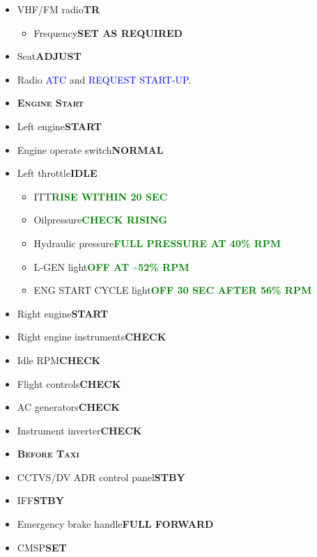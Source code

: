 \documentclass[a4paper,12pt,dvipsnames]{letter}
\newcommand{\radio}[1]{\textcolor{blue}{#1}}
\newcommand{\button}[1]{\textbf{#1}}
\newcommand{\ok}[1]{\textcolor{Green}{\textbf{#1}}}
\newcommand{\myHead}[1]{{\LARGE\textsc{\textbf{#1}}}}
\begin{document}
{\begin{itemize}
 \item VHF/FM radio\dotfill\button{TR}
 \begin{itemize}
  \item Frequency\dotfill\button{SET AS REQUIRED}
 \end{itemize}
 \item Seat\dotfill\button{ADJUST}
 \item Radio \radio{ATC} and \radio{REQUEST START-UP}.
\end{itemize}
%
\newpage
\begin{itemize}
 \item[] \myHead{Engine Start}
 \item Left engine\dotfill\button{START}
 \item Engine operate switch\dotfill\button{NORMAL}
 \item Left throttle\dotfill\button{IDLE}
 \begin{itemize}
  \item ITT\dotfill\ok{RISE WITHIN 20 SEC}
  \item Oilpressure\dotfill\ok{CHECK RISING}
  \item Hydraulic pressure\dotfill\ok{FULL PRESSURE AT 40\% RPM}
  \item L-GEN light\dotfill\ok{OFF AT \textasciitilde52\% RPM}
  \item ENG START CYCLE light\dotfill\ok{OFF 30 SEC AFTER 56\% RPM}
 \end{itemize}
 \item Right engine\dotfill\button{START}
 \item Right engine instruments\dotfill\button{CHECK}
 \item Idle RPM\dotfill\button{CHECK}
 \item Flight controls\dotfill\button{CHECK}
 \item AC generators\dotfill\button{CHECK}
 \item Instrument inverter\dotfill\button{CHECK}
\end{itemize}
%
\newpage
\begin{itemize}
 \item[] \myHead{Before Taxi}
 \item CCTVS/DV ADR control panel\dotfill\button{STBY}
 \item IFF\dotfill\button{STBY}
 \item Emergency brake handle\dotfill\button{FULL FORWARD}
 \item CMSP\dotfill\button{SET}
 \begin{itemize}

\end{itemize}
\end{itemize}}
\end{document}
